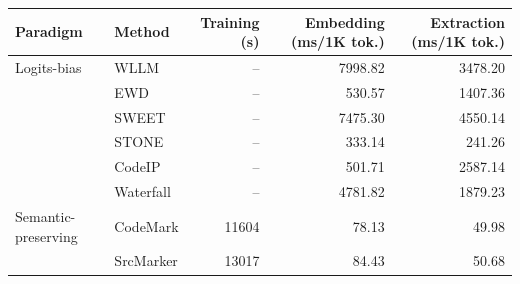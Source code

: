 \begin{tabular}{llrrr}
\toprule
Paradigm & Method & Training (s) & Embedding (ms/1K tok.) & Extraction (ms/1K tok.) \\
\midrule
Logits-bias & WLLM & -- & 7998.82 & 3478.20 \\
 & EWD & -- & 530.57 & 1407.36 \\
 & SWEET & -- & 7475.30 & 4550.14 \\
 & STONE & -- & 333.14 & 241.26 \\
 & CodeIP & -- & 501.71 & 2587.14 \\
 & Waterfall & -- & 4781.82 & 1879.23 \\
Semantic-preserving & CodeMark & 11604 & 78.13 & 49.98 \\
 & SrcMarker & 13017 & 84.43 & 50.68 \\
\bottomrule
\end{tabular}
